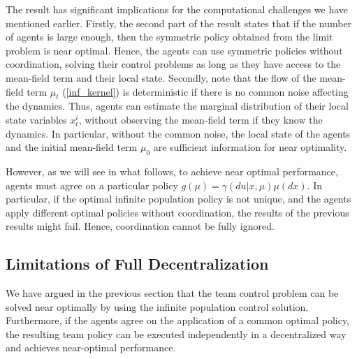 \documentclass[twoside,11pt]{article}
\begin{document}
\begin{remark}
The result has significant implications for the computational challenges we have mentioned earlier. Firstly, the second part of the result states that if the number of agents is large enough, then the symmetric policy obtained from the limit problem is near optimal. Hence,  the agents can use symmetric policies without coordination, solving their control problems as long as they have access to the mean-field term and their local state. Secondly, note that the flow of the mean-field term $\mu_t$ (\ref{inf_kernel}) is deterministic if there is no common noise affecting the dynamics. Thus, agents can estimate the marginal distribution of their local state variables $x_t^i$, without observing the mean-field term if they know the dynamics. In particular, without the common noise, the local state of the agents  and  the initial mean-field term $\mu_0$ are sufficient information for near optimality.

However, as we will see in what follows, to achieve near optimal performance, agents must agree on a particular policy $g(\mu)=\gamma(du|x,\mu)\mu(dx)$. In particular, if the optimal infinite population policy is not unique, and the agents apply different optimal policies without coordination, the results of the previous results might fail. Hence, coordination cannot be fully ignored.
\end{remark}


\subsection{Limitations of Full Decentralization}\label{lim_dec} We have argued in the previous section that the team control problem can be solved near optimally by using the infinite population control  solution. Furthermore, if the agents agree on the application of a common optimal policy, the resulting team policy can be executed independently in a decentralized way and achieves near-optimal performance. 
\end{document}
